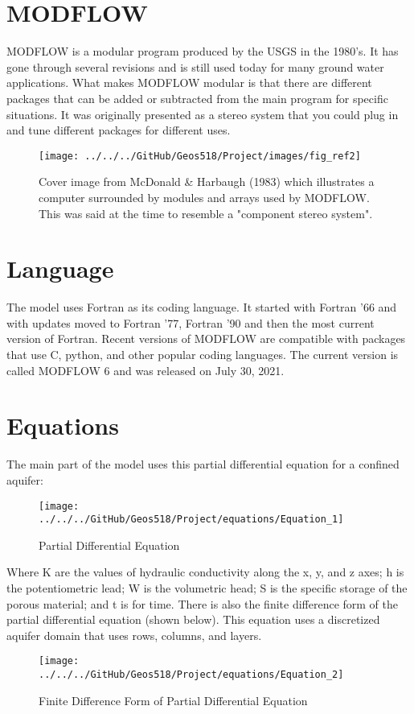 \documentclass[]{report}
\begin{document}
\section{MODFLOW} 
MODFLOW is a modular program produced by the USGS in the 1980’s. It has gone through several revisions and is still used today for many ground water applications. What makes MODFLOW modular is that there are different packages that can be added or subtracted from the main program for specific situations. It was originally presented as a stereo system that you could plug in and tune different packages for different uses.

\begin{figure}[h]
	
	\centering
	\texttt{[image: ../../../GitHub/Geos518/Project/images/fig\_ref2]}
	\caption{Cover image from McDonald \& Harbaugh (1983) which illustrates a computer surrounded by modules and arrays used by MODFLOW. This was said at the time to resemble a "component stereo system".}
	\label{Fig:1}
\end{figure}

\section{Language}
The model uses Fortran as its coding language. It started with Fortran ’66 and with updates moved to Fortran ’77, Fortran ’90 and then the most current version of Fortran. Recent versions of MODFLOW are compatible with packages that use C, python, and other popular coding languages. The current version is called MODFLOW 6 and was released on July 30, 2021.

\section{Equations}
The main part of the model uses this partial differential equation for a confined aquifer:
\begin{figure}[h]
	\centering
	\texttt{[image: ../../../GitHub/Geos518/Project/equations/Equation\_1]}
	\caption{Partial Differential Equation}
\end{figure}
Where K are the values of hydraulic conductivity along the x, y, and z axes; h is the potentiometric lead; W is the volumetric head; S is the specific storage of the porous material; and t is for time.
There is also the finite difference form of the partial differential equation (shown below). This equation uses a discretized aquifer domain that uses rows, columns, and layers.
\begin{figure}[h]
	\centering
	\texttt{[image: ../../../GitHub/Geos518/Project/equations/Equation\_2]}
	\caption{Finite Difference Form of Partial Differential Equation}	
\end{figure}\\
\end{document}

